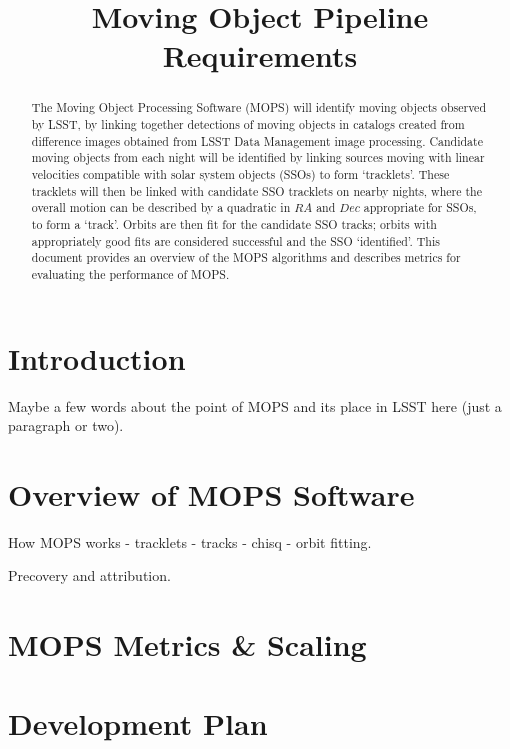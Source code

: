 \documentclass[12pt,preprint]{aastex}
\begin{document}
\title{Moving Object Pipeline Requirements}

\author{}

\begin{abstract}
The Moving Object Processing Software (MOPS) will identify moving
objects observed by LSST, by linking together detections of moving
objects in catalogs created from difference images obtained from LSST
Data Management image processing. Candidate moving objects from each
night will be identified by linking sources moving with linear
velocities compatible with solar system objects (SSOs) to form
`tracklets'. These tracklets will then be linked with candidate SSO
tracklets on nearby nights, where the overall motion can be described
by a quadratic in $RA$ and $Dec$ appropriate for SSOs, to form a
`track'.  Orbits are then fit for the candidate SSO tracks; orbits
with appropriately good fits are considered successful and the SSO
`identified'.  This document provides an overview of the MOPS
algorithms and describes metrics for evaluating the performance of
MOPS.
\end{abstract}

\tableofcontents


\section{Introduction}

Maybe a few words about the point of MOPS and its place in LSST here
(just a paragraph or two). 
 
\section{Overview of MOPS Software}


How MOPS works  - tracklets - tracks - chisq - orbit fitting. 

Precovery and attribution. 


\section{MOPS Metrics \& Scaling}


\section{Development Plan}





\end{document}
